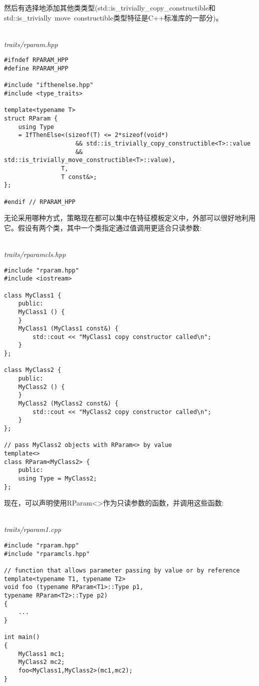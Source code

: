 然后有选择地添加其他类类型(std::is\_trivially\_copy\_constructible和std::is\_trivially\ move\ constructible类型特征是C++标准库的一部分)。

\hspace*{\fill} \\ %
\noindent
\textit{traits/rparam.hpp}
\begin{lstlisting}[style=styleCXX]
#ifndef RPARAM_HPP
#define RPARAM_HPP

#include "ifthenelse.hpp"
#include <type_traits>

template<typename T>
struct RParam {
	using Type
	= IfThenElse<(sizeof(T) <= 2*sizeof(void*)
					&& std::is_trivially_copy_constructible<T>::value
					&& std::is_trivially_move_constructible<T>::value),
				T,
				T const&>;
};

#endif // RPARAM_HPP
\end{lstlisting}

无论采用哪种方式，策略现在都可以集中在特征模板定义中，外部可以很好地利用它。假设有两个类，其中一个类指定通过值调用更适合只读参数:

\hspace*{\fill} \\ %
\noindent
\textit{traits/rparamcls.hpp}
\begin{lstlisting}[style=styleCXX]
#include "rparam.hpp"
#include <iostream>

class MyClass1 {
	public:
	MyClass1 () {
	}
	MyClass1 (MyClass1 const&) {
		std::cout << "MyClass1 copy constructor called\n";
	}
};

class MyClass2 {
	public:
	MyClass2 () {
	}
	MyClass2 (MyClass2 const&) {
		std::cout << "MyClass2 copy constructor called\n";
	}
};

// pass MyClass2 objects with RParam<> by value
template<>
class RParam<MyClass2> {
	public:
	using Type = MyClass2;
};
\end{lstlisting}

现在，可以声明使用RParam<>作为只读参数的函数，并调用这些函数:

\hspace*{\fill} \\ %
\noindent
\textit{traits/rparam1.cpp}
\begin{lstlisting}[style=styleCXX]
#include "rparam.hpp"
#include "rparamcls.hpp"

// function that allows parameter passing by value or by reference
template<typename T1, typename T2>
void foo (typename RParam<T1>::Type p1,
typename RParam<T2>::Type p2)
{
	...
}

int main()
{
	MyClass1 mc1;
	MyClass2 mc2;
	foo<MyClass1,MyClass2>(mc1,mc2);
}
\end{lstlisting}

